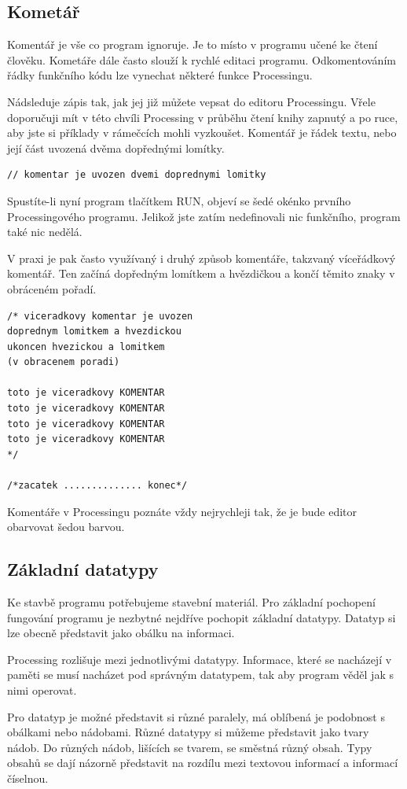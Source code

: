 \documentclass[10pt]{book}
\newcommand{\pododdil}[1]{\subsection{#1}\index{#1}\label{#1}}
\begin{document}
\pododdil{Kometář}
\label{komentar}

Komentář je vše co program ignoruje. Je to místo v programu učené ke čtení člověku. Kometáře dále často slouží k rychlé editaci programu. Odkomentováním řádky funkčního kódu lze vynechat některé funkce Processingu.


Nádsleduje zápis tak, jak jej již můžete vepsat do editoru Processingu. Vřele doporučuji mít v této chvíli Processing v průběhu čtení knihy zapnutý a po ruce, aby jste si příklady v rámečcích mohli vyzkoušet. Komentář je řádek textu, nebo její část uvozená dvěma dopřednými lomítky.


\begin{lstlisting}
// komentar je uvozen dvemi doprednymi lomitky
\end{lstlisting}

Spustíte-li nyní program tlačítkem RUN, objeví se šedé okénko prvního Processingového programu. Jelikož jste zatím nedefinovali nic funkčního, program také nic nedělá.

V praxi je pak často využívaný i druhý způsob komentáře, takzvaný víceřádkový komentář. Ten začíná dopředným lomítkem a hvězdičkou a končí těmito znaky v obráceném pořadí.

\begin{lstlisting}
/* viceradkovy komentar je uvozen
doprednym lomitkem a hvezdickou
ukoncen hvezickou a lomitkem 
(v obracenem poradi)

toto je viceradkovy KOMENTAR
toto je viceradkovy KOMENTAR
toto je viceradkovy KOMENTAR
toto je viceradkovy KOMENTAR
*/

/*zacatek .............. konec*/

\end{lstlisting}

Komentáře v Processingu poznáte vždy nejrychleji tak, že je bude editor obarvovat šedou barvou.

\pododdil{Základní datatypy}

Ke stavbě programu potřebujeme stavební materiál. Pro základní pochopení fungování programu je nezbytné nejdříve pochopit základní datatypy. Datatyp si lze obecně představit jako obálku na informaci.

Processing rozlišuje mezi jednotlivými datatypy. Informace, které se nacházejí v paměti se musí nacházet pod správným datatypem, tak aby program věděl jak s nimi operovat.

Pro datatyp je možné představit si různé paralely, má oblíbená je podobnost s obálkami nebo nádobami. Různé datatypy si můžeme představit jako tvary nádob. Do různých nádob, lišících se tvarem, se směstná různý obsah. Typy obsahů se dají názorně představit na rozdílu mezi textovou informací a informací číselnou.
\end{document}
